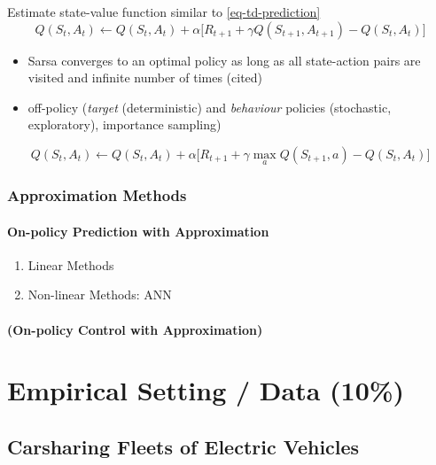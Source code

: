 \documentclass[a4paper, twoside, 12pt]{article}
\begin{document}
Estimate state-value function similar to \ref{eq-td-prediction}
\begin{equation} \label{eq-sarsa}
    Q(S_t, A_t) \leftarrow Q(S_t,A_t) + \alpha\big[R_{t+1}+\gamma Q(S_{t+1},A_{t+1}) - Q(S_t, A_t)\big]
\end{equation}


\begin{itemize}
\item Sarsa converges to an optimal policy as long as all state-action pairs are
visited and infinite number of times (cited)
\end{itemize}


\begin{itemize}
\item off-policy (\emph{target} (deterministic) and \emph{behaviour} policies (stochastic, exploratory), importance sampling)
\end{itemize}
\begin{equation} \label{eq-q-learning}
    Q(S_t, A_t) \leftarrow Q(S_t,A_t) + \alpha\big[R_{t+1}+\gamma\max_a Q(S_{t+1},a) - Q(S_t, A_t)\big]
\end{equation}

\subsubsection{Approximation Methods}
\label{sec:orgbbb8f34}
\paragraph{On-policy Prediction with Approximation}
\label{sec:org30aa751}
\begin{enumerate}
\item Linear Methods
\label{sec:org108b66c}
\item Non-linear Methods: ANN
\label{sec:org8ec4daf}
\end{enumerate}
\paragraph{(On-policy Control with Approximation)}
\label{sec:org108906d}
\clearpage
\section{Empirical Setting / Data (10\%)}
\label{sec:org7dfb4fb}
\subsection{Carsharing Fleets of Electric Vehicles}
\label{sec:orga91a82a}
\end{document}
